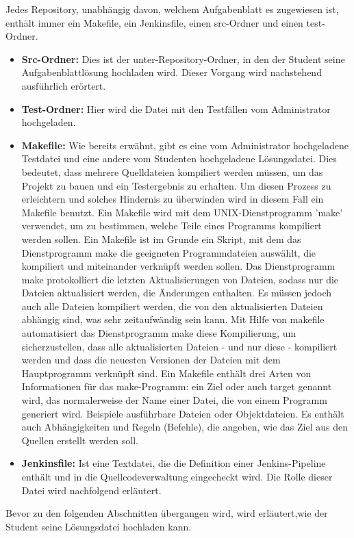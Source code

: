 \documentclass[a4paper,12pt,oneside]{book}
\begin{document}
Jedes Repository, unabhängig davon, welchem Aufgabenblatt es zugewiesen ist, enthält immer ein Makefile, ein Jenkinsfile, einen src-Ordner und einen test-Ordner.
\begin{itemize}
    \item \textbf{Src-Ordner: } Dies ist der unter-Repository-Ordner, in den der Student seine Aufgabenblattlösung hochladen wird. Dieser Vorgang wird nachstehend ausführlich erörtert.
	\item \textbf{Test-Ordner: } Hier wird die Datei mit den Testfällen vom Administrator hochgeladen.
	\item \textbf{Makefile: }  Wie bereits erwähnt, gibt es eine vom Administrator hochgeladene Testdatei und eine andere vom Studenten hochgeladene Lösungsdatei. Dies bedeutet, dass mehrere Quelldateien kompiliert werden müssen, um das Projekt zu bauen und ein Testergebnis zu erhalten. Um diesen Prozess zu erleichtern und solches Hindernis zu überwinden wird in diesem Fall ein Makefile benutzt.
	\newline
	Ein Makefile wird mit dem UNIX-Dienstprogramm 'make' verwendet, um zu bestimmen, welche Teile eines Programms kompiliert werden sollen. Ein Makefile ist im Grunde ein Skript, mit dem das Dienstprogramm make die geeigneten Programmdateien auswählt, die kompiliert und miteinander verknüpft werden sollen. Das Dienstprogramm make protokolliert die letzten Aktualisierungen von Dateien, sodass nur die Dateien aktualisiert werden, die Änderungen enthalten. Es müssen jedoch auch alle Dateien kompiliert werden, die von den aktualisierten Dateien abhängig sind, was sehr zeitaufwändig sein kann. Mit Hilfe von makefile automatisiert das Dienstprogramm make diese Kompilierung, um sicherzustellen, dass alle aktualisierten Dateien - und nur diese - kompiliert werden und dass die neuesten Versionen der Dateien mit dem Hauptprogramm verknüpft sind.
	\newline
	Ein Makefile enthält drei Arten von Informationen für das make-Programm: ein Ziel oder auch target genannt wird, das normalerweise der Name einer Datei, die von einem Programm generiert wird. Beispiele ausführbare Dateien oder Objektdateien. Es enthält auch Abhängigkeiten und Regeln (Befehle), die angeben, wie das Ziel aus den Quellen erstellt werden soll. 
	 
	\item \textbf{Jenkinsfile: } Ist eine Textdatei, die die Definition einer Jenkins-Pipeline enthält und in die Quellcodeverwaltung eingecheckt wird. Die Rolle dieser Datei wird nachfolgend erläutert.
	\end{itemize}
Bevor zu den folgenden Abschnitten übergangen wird, wird erläutert,wie der Student seine Lösungsdatei hochladen kann.
\end{document}
